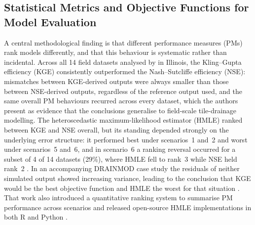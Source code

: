\documentclass[11pt]{article}
\begin{document}
\subsection{Statistical Metrics and Objective Functions for Model Evaluation}

A central methodological finding is that different performance measures (PMs)
rank models differently, and that this behaviour is systematic rather than
incidental. Across all 14 field datasets analysed by \textcite{Bruhn2025} in
Illinois, the Kling--Gupta efficiency (KGE) consistently outperformed the
Nash--Sutcliffe efficiency (NSE): mismatches between KGE-derived outputs were
always smaller than those between NSE-derived outputs, regardless of the
reference output used, and the same overall PM behaviours recurred across every
dataset, which the authors present as evidence that the conclusions generalise
to field-scale tile-drainage modelling. The heteroscedastic maximum-likelihood
estimator (HMLE) ranked between KGE and NSE overall, but its standing depended
strongly on the underlying error structure: it performed best under scenarios~1
and~2 and worst under scenarios~5 and~6, and in scenario~6 a ranking reversal
occurred for a subset of 4 of 14 datasets (29\%), where HMLE fell to rank~3
while NSE held rank~2 \parencite{Bruhn2025}. In an accompanying DRAINMOD case
study the residuals of neither simulated output showed increasing variance,
leading to the conclusion that KGE would be the best objective function and HMLE
the worst for that situation \parencite{Bruhn2025}. That work also introduced a
quantitative ranking system to summarise PM performance across scenarios and
released open-source HMLE implementations in both R and Python
\parencite{Bruhn2025}.
\end{document}
